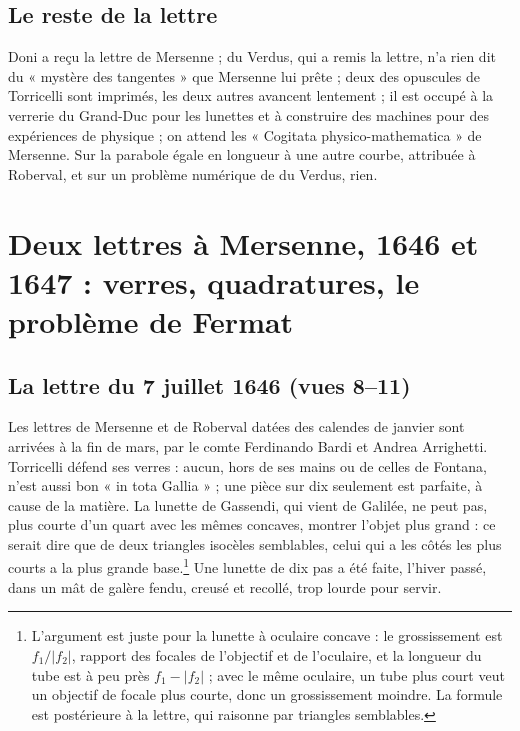 \documentclass[11pt,a4paper]{article}
\begin{document}
\subsection*{Le reste de la lettre}

Doni a reçu la lettre de Mersenne ; du Verdus, qui a remis la lettre, n'a rien
dit du « mystère des tangentes » que Mersenne lui prête ; deux des opuscules de
Torricelli sont imprimés, les deux autres avancent lentement ; il est occupé à la
verrerie du Grand-Duc pour les lunettes et à construire des machines pour des
expériences de physique ; on attend les « Cogitata physico-mathematica » de
Mersenne. Sur la parabole égale en longueur à une autre courbe, attribuée à
Roberval, et sur un problème numérique de du Verdus, rien.

\section*{Deux lettres à Mersenne, 1646 et 1647 : verres, quadratures, le problème de Fermat}

\subsection*{La lettre du 7 juillet 1646 (vues 8--11)}

Les lettres de Mersenne et de Roberval datées des calendes de janvier sont
arrivées à la fin de mars, par le comte Ferdinando Bardi et Andrea Arrighetti.
Torricelli défend ses verres : aucun, hors de ses mains ou de celles de Fontana,
n'est aussi bon « in tota Gallia » ; une pièce sur dix seulement est parfaite, à
cause de la matière. La lunette de Gassendi, qui vient de Galilée, ne peut pas,
plus courte d'un quart avec les mêmes concaves, montrer l'objet plus grand : ce
serait dire que de deux triangles isocèles semblables, celui qui a
les côtés les plus courts a la plus grande base.\footnote{L'argument est juste
pour la lunette à oculaire concave : le grossissement est $f_1/|f_2|$, rapport
des focales de l'objectif et de l'oculaire, et la longueur du tube est à peu près
$f_1-|f_2|$ ; avec le même oculaire, un tube plus court veut un objectif de focale
plus courte, donc un grossissement moindre. La formule est postérieure à la
lettre, qui raisonne par triangles semblables.} Une lunette de dix pas a été
faite, l'hiver passé, dans un mât de galère fendu, creusé et recollé, trop lourde
pour servir.
\end{document}
